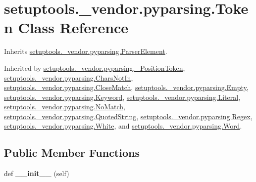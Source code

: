 \hypertarget{classsetuptools_1_1__vendor_1_1pyparsing_1_1_token}{}\section{setuptools.\+\_\+vendor.\+pyparsing.\+Token Class Reference}
\label{classsetuptools_1_1__vendor_1_1pyparsing_1_1_token}


Inherits \hyperlink{classsetuptools_1_1__vendor_1_1pyparsing_1_1_parser_element}{setuptools.\+\_\+vendor.\+pyparsing.\+Parser\+Element}.



Inherited by \hyperlink{classsetuptools_1_1__vendor_1_1pyparsing_1_1___position_token}{setuptools.\+\_\+vendor.\+pyparsing.\+\_\+\+Position\+Token}, \hyperlink{classsetuptools_1_1__vendor_1_1pyparsing_1_1_chars_not_in}{setuptools.\+\_\+vendor.\+pyparsing.\+Chars\+Not\+In}, \hyperlink{classsetuptools_1_1__vendor_1_1pyparsing_1_1_close_match}{setuptools.\+\_\+vendor.\+pyparsing.\+Close\+Match}, \hyperlink{classsetuptools_1_1__vendor_1_1pyparsing_1_1_empty}{setuptools.\+\_\+vendor.\+pyparsing.\+Empty}, \hyperlink{classsetuptools_1_1__vendor_1_1pyparsing_1_1_keyword}{setuptools.\+\_\+vendor.\+pyparsing.\+Keyword}, \hyperlink{classsetuptools_1_1__vendor_1_1pyparsing_1_1_literal}{setuptools.\+\_\+vendor.\+pyparsing.\+Literal}, \hyperlink{classsetuptools_1_1__vendor_1_1pyparsing_1_1_no_match}{setuptools.\+\_\+vendor.\+pyparsing.\+No\+Match}, \hyperlink{classsetuptools_1_1__vendor_1_1pyparsing_1_1_quoted_string}{setuptools.\+\_\+vendor.\+pyparsing.\+Quoted\+String}, \hyperlink{classsetuptools_1_1__vendor_1_1pyparsing_1_1_regex}{setuptools.\+\_\+vendor.\+pyparsing.\+Regex}, \hyperlink{classsetuptools_1_1__vendor_1_1pyparsing_1_1_white}{setuptools.\+\_\+vendor.\+pyparsing.\+White}, and \hyperlink{classsetuptools_1_1__vendor_1_1pyparsing_1_1_word}{setuptools.\+\_\+vendor.\+pyparsing.\+Word}.

\subsection*{Public Member Functions}
\begin{DoxyCompactItemize}
\item 
\mbox{\label{classsetuptools_1_1__vendor_1_1pyparsing_1_1_token_a862cef4540962af281f5af5775fc07bd}} 
def {\bfseries \+\_\+\+\_\+init\+\_\+\+\_\+} (self)
\end{DoxyCompactItemize}
